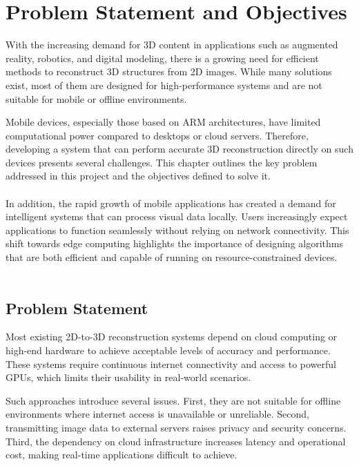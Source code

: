 \chapter{Problem Statement and Objectives}

With the increasing demand for 3D content in applications such as augmented reality, robotics, and digital modeling, there is a growing need for efficient methods to reconstruct 3D structures from 2D images. While many solutions exist, most of them are designed for high-performance systems and are not suitable for mobile or offline environments.

Mobile devices, especially those based on ARM architectures, have limited computational power compared to desktops or cloud servers. Therefore, developing a system that can perform accurate 3D reconstruction directly on such devices presents several challenges. This chapter outlines the key problem addressed in this project and the objectives defined to solve it. \\ \\

In addition, the rapid growth of mobile applications has created a demand for intelligent systems that can process visual data locally. Users increasingly expect applications to function seamlessly without relying on network connectivity. This shift towards edge computing highlights the importance of designing algorithms that are both efficient and capable of running on resource-constrained devices. \\ \\

\section{Problem Statement}

Most existing 2D-to-3D reconstruction systems depend on cloud computing or high-end hardware to achieve acceptable levels of accuracy and performance. These systems require continuous internet connectivity and access to powerful GPUs, which limits their usability in real-world scenarios.

Such approaches introduce several issues. First, they are not suitable for offline environments where internet access is unavailable or unreliable. Second, transmitting image data to external servers raises privacy and security concerns. Third, the dependency on cloud infrastructure increases latency and operational cost, making real-time applications difficult to achieve.

